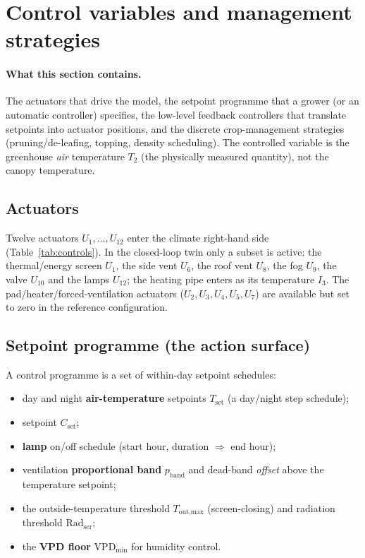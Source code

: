 \documentclass[11pt,a4paper]{article}
\newcommand{\Tair}{T_{2}}
\begin{document}
\section{Control variables and management strategies}\label{sec:control}

\paragraph{What this section contains.} The actuators that drive the model, the setpoint
programme that a grower (or an automatic controller) specifies, the low-level feedback controllers
that translate setpoints into actuator positions, and the discrete crop-management strategies
(pruning/de-leafing, topping, density scheduling). The controlled variable is the greenhouse
\emph{air} temperature $\Tair$ (the physically measured quantity), not the canopy temperature.

\subsection{Actuators}
Twelve actuators $U_1,\dots,U_{12}$ enter the climate right-hand side (Table~\ref{tab:controls}).
In the closed-loop twin only a subset is active: the thermal/energy screen $U_1$, the side vent
$U_6$, the roof vent $U_8$, the fog $U_9$, the  valve $U_{10}$ and the lamps $U_{12}$; the
heating pipe enters as its temperature $I_3$. The pad/heater/forced-ventilation actuators
($U_2,U_3,U_4,U_5,U_7$) are available but set to zero in the reference configuration.

\subsection{Setpoint programme (the action surface)}
A control programme is a set of within-day setpoint schedules:
\begin{itemize}[leftmargin=1.6em,itemsep=1pt]
  \item day and night \textbf{air-temperature} setpoints $T_{\text{set}}$ (a day/night step schedule);
  \item \textbf{} setpoint $C_{\text{set}}$;
  \item \textbf{lamp} on/off schedule (start hour, duration $\Rightarrow$ end hour);
  \item ventilation \textbf{proportional band} $p_{\text{band}}$ and dead-band \emph{offset} above
  the temperature setpoint;
  \item the outside-temperature threshold $T_{\text{out,max}}$ (screen-closing) and radiation
  threshold $\mathrm{Rad}_{\text{scr}}$;
  \item the \textbf{VPD floor} $\mathrm{VPD}_{\min}$ for humidity control.
\end{itemize}
\end{document}

